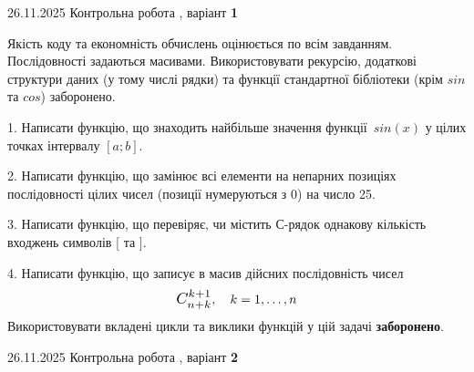 \documentclass[11pt, ukrainian]{article}
\begin{document}
{{26.11.2025 Контрольна робота , варіант  \No \textbf { 1 }\par}}


{
Якість коду та економність обчислень оцінюється по всім завданням. Послідовності задаються масивами. Використовувати рекурсію, додаткові структури даних (у тому числі рядки) та функції стандартної бібліотеки (крім $sin$ та $cos$) заборонено.

\vspace{2mm}

\begin {large}
1. Написати функцію, що знаходить найбільше значення функції~$sin(x)$ у цілих точках інтервалу $[a; b]$.

\vspace{2mm}


2. Написати функцію, що замінює всі елементи на непарних позиціях послідовності цілих чисел (позиції нумеруються з 0) на число 25.

\vspace{2mm}


3. Написати функцію, що перевіряє, чи містить С-рядок однакову кількість входжень символів [ та ].

\vspace{2mm}


4. 
Написати функцію, що записує в масив дійсних послідовність чисел
$$\scalebox{1.2}{$C_{n+k}^{k+1}$}, \quad k=1,\ldots,n$$
\quad Використовувати вкладені цикли та виклики функцій у цій задачі \textbf{заборонено}.

\vspace{2mm}

\end{large}
\vspace{20mm}


{{26.11.2025 Контрольна робота , варіант  \No \textbf { 2 }\par}}


}
\end{document}
